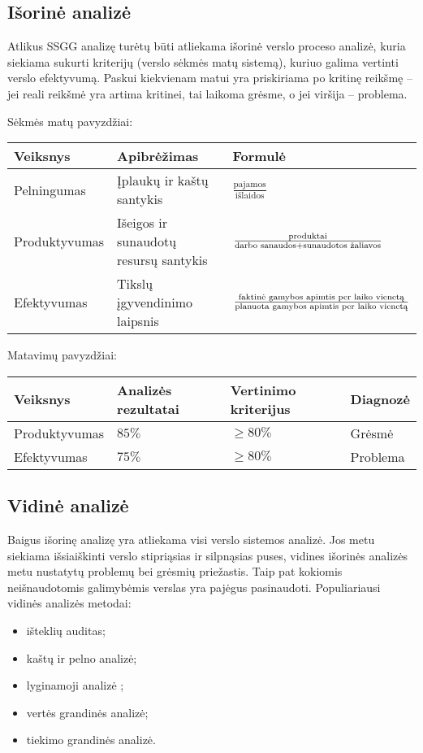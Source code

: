 \subsection{Išorinė analizė}

Atlikus SSGG analizę turėtų būti atliekama išorinė verslo proceso
analizė, kuria siekiama sukurti kriterijų (verslo sėkmės matų sistemą), 
kuriuo galima vertinti verslo efektyvumą. Paskui kiekvienam matui
yra priskiriama po kritinę reikšmę – jei reali reikšmė yra artima kritinei,
tai laikoma grėsme, o jei viršija – problema.
\begin{exmp}
  Sėkmės matų pavyzdžiai:

  \begin{tabularx}{\textwidth}{l|X|X}
    Veiksnys & Apibrėžimas & Formulė \\
    \hline
    Pelningumas & Įplaukų ir kaštų santykis & 
      $\frac{\text{pajamos}}{\text{išlaidos}}$ \\
    Produktyvumas & Išeigos ir sunaudotų resursų santykis &
      $\frac{\text{produktai}}{%
      \text{darbo sanaudos} + \text{sunaudotos žaliavos}}$ \\
    Efektyvumas & Tikslų įgyvendinimo laipsnis &
      $\frac{\text{faktinė gamybos apimtis per laiko vienetą}}{%
      \text{planuota gamybos apimtis per laiko vienetą}}$
  \end{tabularx}

  Matavimų pavyzdžiai:

  \begin{tabularx}{\textwidth}{l|X|X|X}
    Veiksnys & Analizės rezultatai & Vertinimo kriterijus & Diagnozė \\
    \hline
    Produktyvumas & $85 \%$ & $\geq 80 \%$ & Grėsmė \\
    Efektyvumas & $75 \%$ & $\geq 80 \%$ & Problema \\
  \end{tabularx}
\end{exmp}

\subsection{Vidinė analizė}

Baigus išorinę analizę yra atliekama visi verslo sistemos analizė. Jos
metu siekiama išsiaiškinti verslo stipriąsias ir silpnąsias puses,
vidines išorinės analizės metu nustatytų problemų bei grėsmių priežastis.
Taip pat kokiomis neišnaudotomis galimybėmis verslas yra pajėgus 
pasinaudoti. Populiariausi vidinės analizės metodai:
\begin{itemize}
  \item išteklių auditas;
  \item kaštų ir pelno analizė;
  \item lyginamoji analizė ;
  \item vertės grandinės analizė;
  \item tiekimo grandinės analizė.
\end{itemize}

